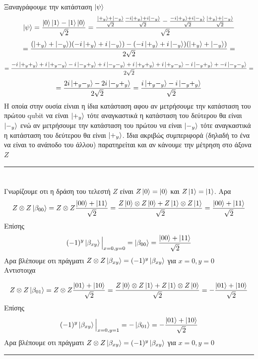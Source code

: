 \documentclass[12pt]{article}
\begin{document}
Ξαναγράφουμε την κατάσταση $\ket{\psi}$
$$\ket{\psi} = \frac{\ket{0}\ket{1} - \ket{1}\ket{0}}{\sqrt{2}} =  \frac{\frac{\ket{+_y} + \ket{-_y}}{\sqrt{2}}\frac{-i\ket{+_y} +i\ket{-_y}}{\sqrt{2}} - \frac{-i\ket{+_y} +i\ket{-_y}}{\sqrt{2}}\frac{\ket{+_y} + \ket{-_y}}{\sqrt{2}}}{\sqrt{2}}$$
$$  =  \frac{(\ket{+_y} + \ket{-_y})(-i\ket{+_y} +i\ket{-_y})-(-i\ket{+_y} +i\ket{-_y})(\ket{+_y} + \ket{-_y})}{2\sqrt{2}} = $$
$$ = \frac{-i\ket{+_y+_y} + i\ket{+_y-_y}-i\ket{-_y+_y} + i\ket{-_y-_y}+i\ket{+_y+_y} +i\ket{+_y-_y}-i\ket{-_y+_y} + -i\ket{-_y-_y}}{2\sqrt{2}}=$$
$$ = \frac{2i\ket{+_y-_y}-2i\ket{-_y+_y} }{2\sqrt{2}}= \frac{i\ket{+_y-_y}-i\ket{-_y+_y} }{\sqrt{2}}$$
Η οποία στην ουσία είνιαι η ίδια κατάσταση αφου αν μετρήσουμε την κατάσταση του πρώτου \textlatin{qubit} να είναι $\ket{+_y}$ 
τότε αναγκαστικά η κατάσταση του δεύτερου θα είναι $\ket{-_y}$ ενώ αν μετρήσουμε την κατάσταση του πρώτου να είναι $\ket{-_y}$
τότε αναγκαστικά η κατάσταση του δεύτερου θα είναι $\ket{+_y}$. Ίδια ακριβώς συμπεριφορά (δηλαδή το ένα να είναι το ανάποδο του άλλου) παρατηρείται και αν κάνουμε την μέτρηση στο άξονα $Z$\\
\rule{\textwidth}{.5pt}
\section*{{}}
Γνωρίζουμε οτι η δράση του  τελεστή $Z$ είναι $Z\ket{0} = \ket{0} $ και $Z\ket{1} = \ket{1}$. Αρα
$$Z\otimes Z\ket{\beta_{00}} =  Z\otimes Z\frac{\ket{00} +\ket{11}}{\sqrt{2}} =\frac{Z\ket{0}\otimes Z\ket{0} +Z\ket{1}\otimes Z\ket{1}}{\sqrt{2}} 
=\frac{\ket{00} + \ket{11}}{\sqrt{2}}$$
Επίσης
$$(-1)^y\ket{\beta_{xy}} \Big|_{x=0,y=0} = \ket{\beta_{00}}= \frac{\ket{00} + \ket{11}}{\sqrt{2}}$$
Αρα βλέπουμε οτι πράγματι $Z\otimes Z\ket{\beta_{xy}}=(-1)^y\ket{\beta_{xy}}$ για $x=0,y=0$\\
Αντιστοιχα 

$$Z\otimes Z\ket{\beta_{01}} =  Z\otimes Z\frac{\ket{01} +\ket{10}}{\sqrt{2}} =\frac{Z\ket{0}\otimes Z\ket{1} +Z\ket{1}\otimes Z\ket{0}}{\sqrt{2}} 
=-\frac{\ket{01} + \ket{10}}{\sqrt{2}}$$
Επίσης
$$(-1)^y\ket{\beta_{xy}} \Big|_{x=0,y=1} = -\ket{\beta_{01}}= -\frac{\ket{01} + \ket{10}}{\sqrt{2}}$$
Αρα βλέπουμε οτι πράγματι $Z\otimes Z\ket{\beta_{xy}}=(-1)^y\ket{\beta_{xy}}$ για $x=0,y=0$\\
\rule{\textwidth}{.5pt}
\end{document}
